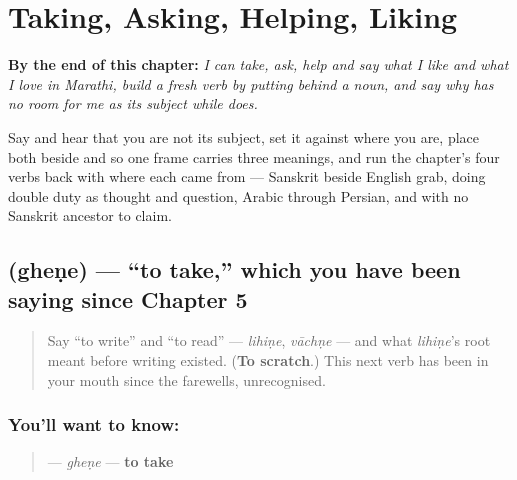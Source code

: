 
\chapter{Taking, Asking, Helping, Liking}
\label{ch:mr-doing-verbs}

\begin{chapteropening}
\textbf{By the end of this chapter:} \emph{I can take, ask, help and say what I like and what I love in Marathi, build a fresh verb by putting  behind a noun, and say why    has no room for me as its subject while    does.}

Say    and hear that you are not its subject, set it against    where you are, place both beside    and    so one frame carries three meanings, and run the chapter's four verbs back with where each came from — Sanskrit  beside English grab,  doing double duty as thought and question, Arabic  through Persian, and  with no Sanskrit ancestor to claim.
\end{chapteropening}

\section[gheṇe]{ (gheṇe) — \textquotedblleft{}to take,\textquotedblright{} which you have been saying since Chapter 5}

\label{lesson:MR-C09-ghene}



\begin{quote}
Say \textquotedblleft{}to write\textquotedblright{} and \textquotedblleft{}to read\textquotedblright{} — \emph{lihiṇe}, \emph{vāchṇe} — and what \emph{lihiṇe}'s root meant before writing existed. (\textbf{To scratch}.) This next verb has been in your mouth since the farewells, unrecognised.
\end{quote}

\subsection*{You'll want to know: }
\begin{quote}
\textbf{} — \emph{gheṇe} — \textbf{to take}
\end{quote}

